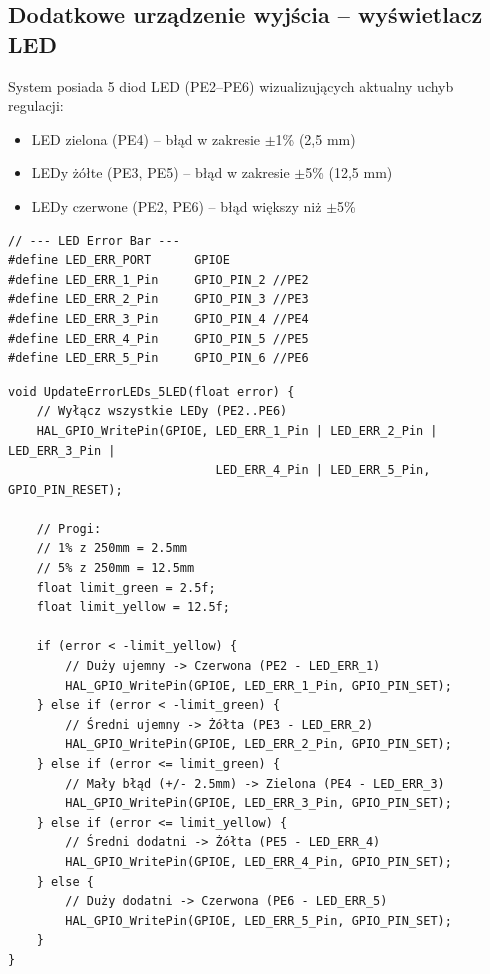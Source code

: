 \documentclass[11pt]{article}
\begin{document}
\subsection{Dodatkowe urządzenie wyjścia -- wyświetlacz LED}

System posiada 5 diod LED (PE2--PE6) wizualizujących aktualny uchyb regulacji:
\begin{itemize}
    \item LED zielona (PE4) -- błąd w zakresie $\pm$1\% (2,5 mm)
    \item LEDy żółte (PE3, PE5) -- błąd w zakresie $\pm$5\% (12,5 mm)
    \item LEDy czerwone (PE2, PE6) -- błąd większy niż $\pm$5\%
\end{itemize}

\begin{lstlisting}[caption={Definicje pinow LED (main.h)}, style=cstyle]
// --- LED Error Bar ---
#define LED_ERR_PORT      GPIOE
#define LED_ERR_1_Pin     GPIO_PIN_2 //PE2
#define LED_ERR_2_Pin     GPIO_PIN_3 //PE3
#define LED_ERR_3_Pin     GPIO_PIN_4 //PE4
#define LED_ERR_4_Pin     GPIO_PIN_5 //PE5
#define LED_ERR_5_Pin     GPIO_PIN_6 //PE6
\end{lstlisting}

\begin{lstlisting}[caption={Update stanu LED (leds.c)}, style=cstyle]
void UpdateErrorLEDs_5LED(float error) {
	// Wyłącz wszystkie LEDy (PE2..PE6)
	HAL_GPIO_WritePin(GPIOE, LED_ERR_1_Pin | LED_ERR_2_Pin | LED_ERR_3_Pin | 
	                         LED_ERR_4_Pin | LED_ERR_5_Pin, GPIO_PIN_RESET);
	
	// Progi: 
	// 1% z 250mm = 2.5mm
	// 5% z 250mm = 12.5mm
	float limit_green = 2.5f;
	float limit_yellow = 12.5f;
	
	if (error < -limit_yellow) {
		// Duży ujemny -> Czerwona (PE2 - LED_ERR_1)
		HAL_GPIO_WritePin(GPIOE, LED_ERR_1_Pin, GPIO_PIN_SET);
	} else if (error < -limit_green) {
		// Średni ujemny -> Żółta (PE3 - LED_ERR_2)
		HAL_GPIO_WritePin(GPIOE, LED_ERR_2_Pin, GPIO_PIN_SET);
	} else if (error <= limit_green) { 
		// Mały błąd (+/- 2.5mm) -> Zielona (PE4 - LED_ERR_3)
		HAL_GPIO_WritePin(GPIOE, LED_ERR_3_Pin, GPIO_PIN_SET);
	} else if (error <= limit_yellow) {
		// Średni dodatni -> Żółta (PE5 - LED_ERR_4)
		HAL_GPIO_WritePin(GPIOE, LED_ERR_4_Pin, GPIO_PIN_SET);
	} else {
		// Duży dodatni -> Czerwona (PE6 - LED_ERR_5)
		HAL_GPIO_WritePin(GPIOE, LED_ERR_5_Pin, GPIO_PIN_SET);
	}
}
\end{lstlisting}
\end{document}
